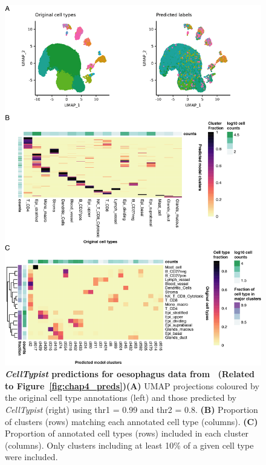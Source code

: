\begin{figure}[pht!] 
\centering
\includegraphics[scale=0.8]{Appendix2/Figs/appB_oes.png} %
\caption[\textit{CellTypist} predictions for oesophagus data from~\citep{madissoon_lung_2019}]{\textbf{\textit{CellTypist} predictions for oesophagus data from~\citep{madissoon_lung_2019} (Related to Figure~\ref{fig:chap4_preds})}\newline\textbf{(A)} UMAP projections coloured by the original cell type annotations (left) and those predicted by \textit{CellTypist} (right) using thr1 = 0.99 and thr2 = 0.8. \textbf{(B)} Proportion of clusters (rows) matching each annotated cell type (columns). \textbf{(C)} Proportion of annotated cell types (rows) included in each cluster (columns). Only clusters including at least 10\% of a given cell type were included.}
\label{fig:appB_oes}
\end{figure}


